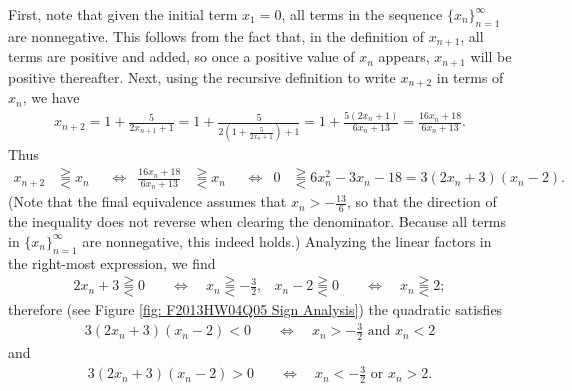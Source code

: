First, note that given the initial term $x_{1} = 0$, all terms in the sequence $\{ x_{n} \}_{n=1}^{\infty}$ are nonnegative. This follows from the fact that, in the definition of $x_{n+1}$, all terms are positive and added, so once a positive value of $x_{n}$ appears, $x_{n+1}$ will be positive thereafter. Next, using the recursive definition to write $x_{n+2}$ in terms of $x_{n}$, we have
\begin{align*}
x_{n+2} = 1 + \frac{5}{2 x_{n+1} + 1} = 1 + \frac{5}{2 \left( 1 + \frac{5}{2 x_{n} + 1} \right) + 1} = 1 + \frac{5 (2 x_{n} + 1)}{6 x_{n} + 13} = \frac{16 x_{n} + 18}{6 x_{n} + 13}.
\end{align*}
Thus
\begin{align}
x_{n+2} &\gtreqqless x_{n}
&
&\Leftrightarrow
&
\frac{16 x_{n} + 18}{6 x_{n} + 13} &\gtreqqless x_{n}
&
&\Leftrightarrow
&
0 &\gtreqqless 6 x_{n}^{2} - 3 x_{n} - 18 = 3 (2 x_{n} + 3) (x_{n} - 2).\label{eq: F2013HW04Q05 Terms Two Apart}
\end{align}
(Note that the final equivalence assumes that $x_{n} > -\frac{13}{6}$, so that the direction of the inequality does not reverse when clearing the denominator. Because all terms in $\{ x_{n} \}_{n=1}^{\infty}$ are nonnegative, this indeed holds.) Analyzing the linear factors in the right-most expression, we find
\begin{align*}
2 x_{n} + 3 \gtreqqless 0 \quad &\Leftrightarrow \quad x_{n} \gtreqqless -\frac{3}{2},
&
x_{n} - 2 \gtreqqless 0 \quad &\Leftrightarrow \quad x_{n} \gtreqqless 2;
\end{align*}
therefore (see Figure \ref{fig: F2013HW04Q05 Sign Analysis}) the quadratic satisfies
\begin{align}
3 (2 x_{n} + 3) (x_{n} - 2) < 0 \quad &\Leftrightarrow \quad x_{n} > -\frac{3}{2} \text{ and } x_{n} < 2\label{eq: F2013HW04Q05 Increasing Condition}
\end{align}
and
\begin{align}
3 (2 x_{n} + 3) (x_{n} - 2) > 0 \quad &\Leftrightarrow \quad x_{n} < -\frac{3}{2} \text{ or } x_{n} > 2.\label{eq: F2013HW04Q05 Decreasing Condition}
\end{align}


